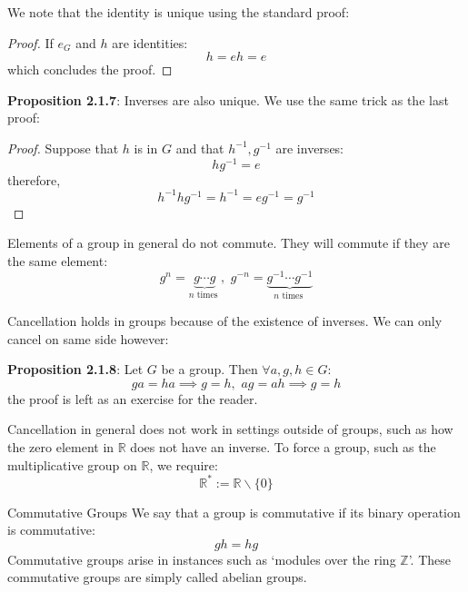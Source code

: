\documentclass{report}
\begin{document}
We note that the identity is unique using the standard proof:
    \begin{proof}
        If $e_{G}$ and $h$ are identities:
            \begin{equation*}
                h = eh = e
            \end{equation*}
        which concludes the proof.
    \end{proof}

\textbf{Proposition 2.1.7}: Inverses are also unique. We use the same trick as the last proof:
    \begin{proof}
        Suppose that $h$ is in $G$ and that $h^{-1}, g^{-1}$ are inverses:
            \begin{equation*}
                hg^{-1} = e
            \end{equation*}
        therefore, 
            \begin{equation*}
                h^{-1}hg^{-1} = h^{-1} = eg^{-1} = g^{-1}
            \end{equation*}
    \end{proof}

Elements of a group in general do not commute. They will commute if they are the same element:
    \begin{equation*}
        g^{n} = \underbrace{g \cdots g}_{n \text{ times }}, \, \, g^{-n} = \underbrace{g^{-1} \cdots g^{-1}}_{n \text{ times }}
    \end{equation*}

Cancellation holds in groups because of the existence of inverses. We can only cancel on same side however:

\textbf{Proposition 2.1.8}: Let $G$ be a group. Then $\forall a, g, h \in G$:
    \begin{equation*}
        ga = ha \implies g = h, \, \, ag = ah \implies g = h
    \end{equation*}
the proof is left as an exercise for the reader.

Cancellation in general does not work in settings outside of groups, such as how the zero element in $\mathbb{R}$ does not have an inverse. To force a group, such as the multiplicative group on $\mathbb{R}$, we require:
    \begin{equation*}
        \mathbb{R}^{*} := \mathbb{R} \backslash \{0\}
    \end{equation*}

\begin{definition}[\label{def:2.1.5}]{Commutative Groups}
    We say that a group is commutative if its binary operation is commutative:
        \begin{equation*}
            gh = hg
        \end{equation*}
    Commutative groups arise in instances such as `modules over the ring $\mathbb{Z}$'. These commutative groups are simply called abelian groups.
\end{definition}
\end{document}
